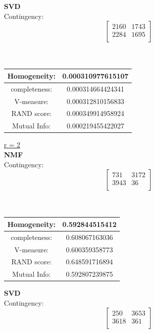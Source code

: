 \documentclass{report}
\begin{document}
\textbf{SVD} \\
Contingency: \[
\begin{bmatrix}
 2160			& 1743 \\
 2284 			& 1695 \\
\end{bmatrix}
\]
\\ \\

\begin{center}
\begin{tabu}{| c | c |}
\hline
Homogeneity: & 0.000310977615107 \\
\hline 
completeness: & 0.000314664424341 \\
\hline
V-measure: & 0.000312810156833  \\
\hline
RAND score: & 0.000349914958924  \\
\hline
Mutual Info:  & 0.000219455422027 \\
\hline
\end{tabu}
\end{center}

\underline{r = 2} \\
\textbf{NMF} \\
Contingency: \[
\begin{bmatrix}
 731		& 3172 \\
 3943		& 36 \\
\end{bmatrix}
\]
\\ \\

\begin{center}
\begin{tabu}{ | c | c | }
\hline 
Homogeneity: 	& 0.592844515412 \\
\hline
completeness:	& 0.608067163036 \\
\hline
V-measure: 		& 0.600359358773 \\
\hline
RAND score: 	& 0.648591716894 \\
\hline
Mutual Info:	& 0.592807239875 \\
\hline
\end{tabu}
\end{center}


\textbf{SVD} \\
Contingency: \[
\begin{bmatrix}
250 		& 3653 \\
3618  		& 361 \\
\end{bmatrix}
\]
\\ \\
\end{document}
